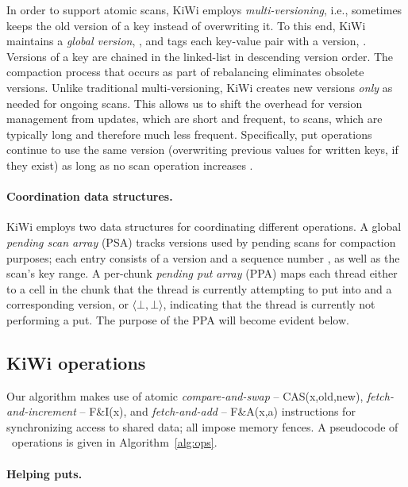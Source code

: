 In order to support atomic scans, KiWi employs \emph{multi-versioning}, i.e., sometimes keeps the old version of a key instead of overwriting it. To this end, KiWi maintains a \emph{global version}, , and tags each key-value pair with a version, . Versions of a key are chained in the linked-list in descending version order. The compaction process that occurs as part of rebalancing eliminates obsolete versions.
Unlike traditional multi-versioning, KiWi creates new versions \emph{only} as needed for ongoing scans.
This allows us to shift the overhead for version management  from updates, which are short and frequent, to scans, which are typically long and therefore much less frequent. Specifically, put operations continue to use the same version (overwriting previous values for written keys, if they exist) as long as no scan operation increases  .


\paragraph{Coordination data structures.}
KiWi employs two %
data structures for coordinating different operations. 
A global \emph{pending scan array} (PSA) tracks versions used by pending scans for compaction purposes;
each entry consists of a version  and a sequence number , as well as the scan's key range.
A per-chunk \emph{pending put array} (PPA) maps each thread either to a cell in the chunk that the thread is currently attempting to put into and a corresponding version, or $\langle \bot,\bot\rangle$, indicating that the thread is currently not performing a put.
The purpose of the PPA will become evident below.

\subsection{KiWi operations}
\label{sec:ops}

Our algorithm makes use of atomic \emph{compare-and-swap} -- CAS(x,old,new),  \emph{fetch-and-increment} -- F\&I(x), and
\emph{fetch-and-add} -- F\&A(x,a) instructions for synchronizing access to shared data; all impose memory fences.
A pseudocode of \kiwi\ operations is given in Algorithm~\ref{alg:ops}.

\paragraph{Helping puts.}

